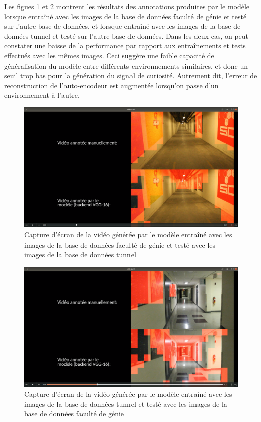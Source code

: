     Les figues \ref{fig:frame_tr_corridor_test_tunnel} et \ref{fig:frame_tr_tunnel_test_corridor} montrent les résultats des annotations produites par le modèle lorsque entraîné avec les images de la base de données faculté de génie et testé sur l'autre base de données, et lorsque entraîné avec les images de la base de données tunnel et testé sur l'autre base de données. Dans les deux cas, on peut constater une baisse de la performance par rapport aux entraînements et tests effectués avec les mêmes images. Ceci suggère une faible capacité de généralisation du modèle entre différents environnements similaires, et donc un seuil trop bas pour la génération du signal de curiosité. Autrement dit, l'erreur de reconstruction de l'auto-encodeur est augmentée lorsqu'on passe d'un environnement à l'autre.
    \bigskip

    \begin{figure}
        \centering
        \includegraphics[width=17cm]{images/frame_tr_corridor_test_tunnel.png}
        \caption{Capture d'écran de la vidéo générée par le modèle entraîné avec les images de la base de données faculté de génie et testé avec les images de la base de données tunnel}
        \label{fig:frame_tr_corridor_test_tunnel}
    \end{figure}

    \begin{figure}
        \centering
        \includegraphics[width=17cm]{images/frame_tr_tunnel_test_corridor.png}
        \caption{Capture d'écran de la vidéo générée par le modèle entraîné avec les images de la base de données tunnel et testé avec les images de la base de données faculté de génie}
        \label{fig:frame_tr_tunnel_test_corridor}
    \end{figure}
    
